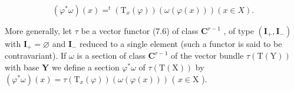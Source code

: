 \[
(\varphi^ {*} \omega) (x) = ^ {t} (\mathrm{T} _ {x} (\varphi)) (\omega (\varphi (x))) (x \in X).
\]

More generally, let \(\tau\) be a vector functor (7.6) of class \(\mathbf{C}^{r-1}\) , of type \((\mathbf{I}_{+}, \mathbf{I}_{-})\) with \(\mathbf{I}_{+} = \varnothing\) and \(\mathbf{I}_{-}\) reduced to a single element (such a functor is said to be contravariant). If \(\omega\) is a section of class \(\mathbf{C}^{r-1}\) of the vector bundle \(\tau(\mathrm{T}(\mathrm{Y}))\) with base \(\mathbf{Y}\) we define a section \(\varphi^{*}\omega\) of \(\tau(\mathrm{T}(\mathrm{X}))\) by \((\varphi^{*}\omega)(x) = \tau(\mathrm{T}_{x}(\varphi))(\omega(\varphi(x)))\) ( \(x \in \mathrm{X}\) ).
